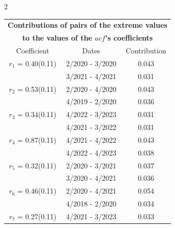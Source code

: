 
\thispagestyle{empty}
\begin{multicols}{2}{ 
\begin{tabular}{ccc}
\multicolumn{3}{c}{\textbf{Contributions of pairs of the extreme values} }  \vspace{-.10in}  \\ 
\multicolumn{3}{c}{ \textbf{to the values of the $acf$'s coefficients}} \\ 
\hline 
\hline                  Coefficient  &  Dates &  Contribution \\ 
\hline 
  $r_{ 1}$ = 0.40(0.11) &       2/2020 -  3/2020 &        0.043   \vspace{-.10in} \\  
&        3/2021 -  4/2021 &        0.031  \vspace{-.02in} \\ \hline 
  $r_{ 2}$ = 0.53(0.11) &       2/2020 -  4/2020 &        0.043   \vspace{-.10in} \\  
&        4/2019 -  2/2020 &        0.036  \vspace{-.02in} \\ \hline 
  $r_{ 3}$ = 0.34(0.11) &       4/2022 -  3/2023 &        0.031   \vspace{-.10in} \\  
&        4/2021 -  3/2022 &        0.031  \vspace{-.02in} \\ \hline 
  $r_{ 4}$ = 0.87(0.11) &       4/2021 -  4/2022 &        0.043   \vspace{-.10in} \\  
&        4/2022 -  4/2023 &        0.038  \vspace{-.02in} \\ \hline 
  $r_{ 5}$ = 0.32(0.11) &       2/2020 -  3/2021 &        0.037   \vspace{-.10in} \\  
&        3/2020 -  4/2021 &        0.036  \vspace{-.02in} \\ \hline 
  $r_{ 6}$ = 0.46(0.11) &       2/2020 -  4/2021 &        0.054   \vspace{-.10in} \\  
&        4/2018 -  2/2020 &        0.034  \vspace{-.02in} \\ \hline 
  $r_{ 7}$ = 0.27(0.11) &       4/2021 -  3/2023 &        0.033   \vspace{-.10in} \\  

\end{tabular}}
\end{multicols}
